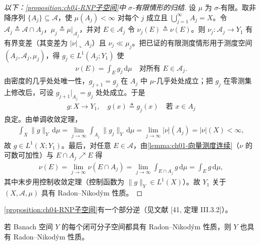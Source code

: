 \documentclass[../../main.tex]{subfiles}%
\begin{document}
\begin{proof}[以下：\cref{proposition:ch04-RNP子空间}中 $\sigma$-有限情形的归结]
设 $\mu$ 为 $\sigma$-有限。取非降序列 $\{A_j\}\subseteq\mathcal{A}$，使 $\mu(A_j)<\infty$ 对每个 $j$ 成立且 $\bigcup_{j=1}^\infty A_j=X$。令 $\mathcal{A}_j\triangleq \mathcal{A}\cap A_j$，$\mu_j\triangleq \mu|_{\mathcal{A}_j}$，并对 $E\in\mathcal{A}_j$ 令 $\nu_j(E)\triangleq \nu(E)$。则 $\nu_j:\mathcal{A}_j\to Y_1$ 有有界变差（其变差为 $|\nu|\llcorner A_j$）且 $\nu_j\ll\mu_j$。把已证的有限测度情形用于测度空间 $(A_j,\mathcal{A}_j,\mu_j)$，得 $g_j\in L^1(A_j;Y_1)$ 使
\begin{align*}
\nu(E)=\int_E g_j\,\mathrm{d}\mu\quad\text{对所有 }E\in\mathcal{A}_j.
\end{align*}
由密度的几乎处处唯一性，$g_{j+1}=g_j$ 在 $A_j$ 中 $\mu$-几乎处处成立；把 $g_j$ 在零测集上修改后，可设 $g_{j+1}|_{A_j}=g_j$ 处处成立。于是
\begin{align*}
g:X\to Y_1,\quad g(x)\triangleq g_j(x)\quad\text{若 }x\in A_j
\end{align*}
良定。由单调收敛定理，
\begin{align*}
\int_X\|g\|_Y\,\mathrm{d}\mu=\lim_{j\to\infty}\int_{A_j}\|g_j\|_Y\,\mathrm{d}\mu=\lim_{j\to\infty}|\nu|(A_j)=|\nu|(X)<\infty,
\end{align*}
故 $g\in L^1(X;Y_1)$。最后，对任意 $E\in\mathcal{A}$，由\cref{lemma:ch01-向量测度连续}（$\nu$ 的可数可加性）与 $E\cap A_j\nearrow E$ 得
\begin{align*}
\nu(E)=\lim_{j\to\infty}\nu(E\cap A_j)=\lim_{j\to\infty}\int_{E\cap A_j}g\,\mathrm{d}\mu=\int_E g\,\mathrm{d}\mu,
\end{align*}
其中末步用控制收敛定理（控制函数为 $\|g\|_Y\in L^1(X)$）。故 $Y_1$ 关于 $(X,\mathcal{A},\mu)$ 具有 Radon--Nikodým 性质。
\end{proof}

\cref{proposition:ch04-RNP子空间}有一个部分逆（见文献 [41, 定理 III.3.2]）。

\begin{proposition}\label{proposition:ch04-RNP可分子空间}
若 Banach 空间 $Y$ 的每个闭可分子空间都具有 Radon--Nikodým 性质，则 $Y$ 也具有 Radon--Nikodým 性质。
\end{proposition}
\end{document}

